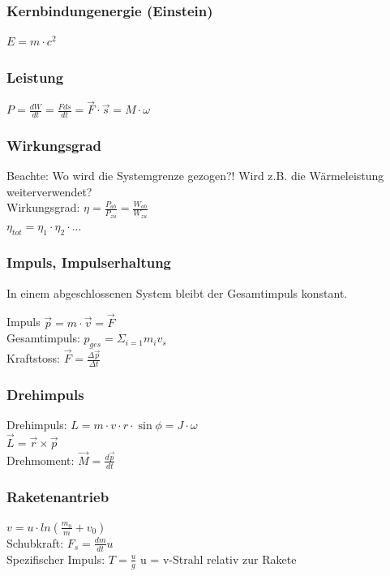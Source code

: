\subsubsection{Kernbindungenergie (Einstein)}
$E = m \cdot c^2$

\subsubsection{Leistung}
$P = \frac{dW}{dt} = \frac{Fds}{dt} =\overrightarrow{F} \cdot \overrightarrow{s} = M \cdot \omega$

\subsubsection{Wirkungsgrad}
Beachte: Wo wird die Systemgrenze gezogen?! Wird z.B. die Wärmeleistung weiterverwendet? \\
Wirkungsgrad: $\eta = \frac{P_{ab}}{P_{zu}} = \frac{W_{ab}}{W_{zu}}$ \\
$\eta_{tot} = \eta_{1} \cdot \eta_{2}  \cdot ...$

\subsubsection{Impuls, Impulserhaltung}
In einem abgeschlossenen System bleibt der Gesamtimpuls konstant. 

Impuls $ \overrightarrow{p} = m \cdot \overrightarrow{v} = \overrightarrow{F}$  \\
Gesamtimpuls: $ p_{ges} = \Sigma_{i = 1} m_{i}v_{s} $\\
Kraftstoss: $\overrightarrow{F} = \frac{\Delta \overrightarrow{p}}{ \Delta t}$

\subsubsection{Drehimpuls}
Drehimpuls: $L = m \cdot v \cdot r \cdot \sin{\phi} = J \cdot \omega$ \\
$\overrightarrow{L} = \overrightarrow{r} \times \overrightarrow{p}$ \\
Drehmoment: $ \overrightarrow{M} = \frac{d \overrightarrow{p}}{dt}
$

\subsubsection{Raketenantrieb}
$v = u \cdot ln(\frac{m_0}{m} + v_0) $ \\
Schubkraft: $F_s = \frac{dm}{dt} u$ \\
Spezifischer Impuls: $T = \frac{u}{g}$
u = v-Strahl relativ zur Rakete\\ 

